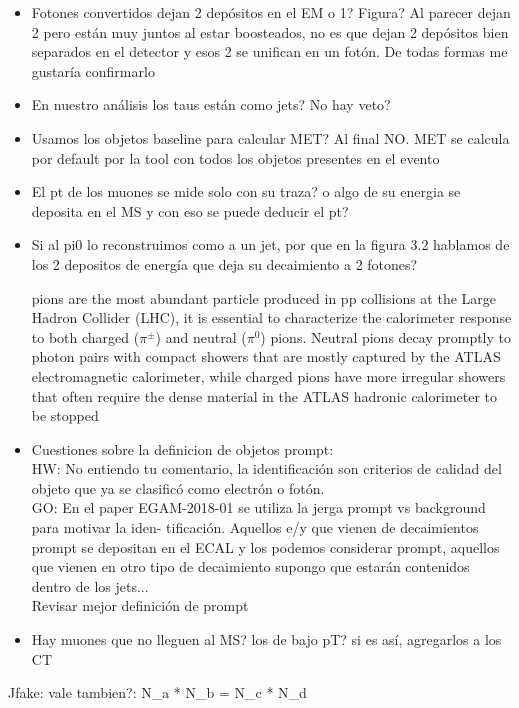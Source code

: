 \begin{itemize}
	\item Fotones convertidos dejan 2 depósitos en el EM o 1? Figura? Al parecer dejan 2 pero están muy juntos al estar boosteados, no es que dejan 2 depósitos bien separados en el detector y esos 2 se unifican en un fotón. De todas formas me gustaría confirmarlo
	\item En nuestro análisis los taus están como jets? No hay veto?
	\item Usamos los objetos baseline para calcular MET? Al final NO. MET se calcula por default por la tool con todos los objetos presentes en el evento
	\item El pt de los muones se mide solo con su traza? o algo de su energia se deposita en el MS y con eso se puede deducir el pt?
	\item Si al pi0 lo reconstruimos como a un jet, por que en la figura 3.2 hablamos de los 2 depositos de energía que deja su decaimiento a 2 fotones?

	pions are the most abundant particle produced in pp collisions at the Large Hadron Collider
(LHC), it is essential to characterize the calorimeter response to both charged ($\pi^{\pm}$) and neutral ($\pi^{0}$) pions. Neutral pions decay promptly to photon pairs with compact showers that are mostly captured by the
ATLAS electromagnetic calorimeter, while charged pions have more irregular showers that often require
the dense material in the ATLAS hadronic calorimeter to be stopped

	\item Cuestiones sobre la definicion de objetos prompt: \\
	HW: No entiendo tu comentario, la identificación son criterios de calidad del objeto que ya se clasificó como electrón o fotón. \\
	GO: En	el paper EGAM-2018-01 se utiliza la jerga prompt vs background para motivar la iden-
	tificación. Aquellos e/y que vienen de decaimientos prompt se depositan en el ECAL y
	los podemos considerar prompt, aquellos que vienen en otro tipo de decaimiento supongo
	que estarán contenidos dentro de los jets... \\
	Revisar mejor definición de prompt
	\item Hay muones que no lleguen al MS? los de bajo pT? si es así, agregarlos a los CT
\end{itemize}

Jfake:
vale tambien?: N_a * N_b = N_c * N_d